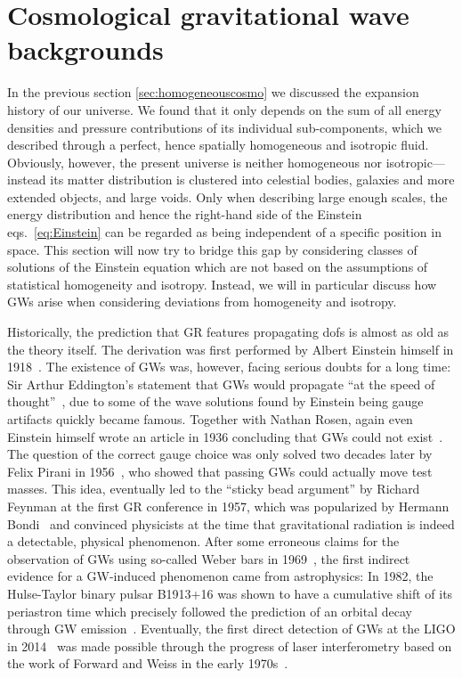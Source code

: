 \section{Cosmological gravitational wave backgrounds}  \label{sec:GWs}

In the previous section \ref{sec:homogeneouscosmo} we discussed the expansion history of our universe. We found that it only depends on the sum of all energy densities and pressure contributions of its individual sub-components, which we described through a perfect, hence spatially homogeneous and isotropic fluid. Obviously, however, the present universe is neither homogeneous nor  isotropic---instead its matter distribution is clustered into celestial bodies, galaxies and more extended objects, and large voids. Only when describing large enough scales, the energy distribution and hence the right-hand side of the Einstein eqs.~\eqref{eq:Einstein} can be regarded as being independent of a specific position in space. This section will now try to bridge this gap by considering classes of solutions of the Einstein equation which are not based on the assumptions of statistical homogeneity and isotropy. Instead, we will in particular discuss how \acfp{GW} arise when considering deviations from homogeneity and isotropy.

Historically, the prediction that \ac{GR} features propagating \acp{dof} is almost as old as the theory itself. The derivation was first performed by Albert Einstein himself in 1918~\cite{Einstein:1916cc, Einstein:1918btx}. The existence of \acp{GW} was, however, facing serious doubts for a long time: Sir Arthur Eddington's statement that \acp{GW} would propagate ``at the speed of thought''~\cite{Eddington:1922ds},  due to some of the wave solutions found by Einstein being gauge artifacts quickly became famous. Together with Nathan Rosen, again even Einstein himself wrote an article in 1936 concluding that \acp{GW} could not exist~\cite{Einstein:1937qu}. The question of the correct gauge choice was only solved two decades later by Felix Pirani in 1956~\cite{Pirani:1956tn}, who showed that passing \acp{GW} could actually move test masses. This idea, eventually led to the ``sticky bead argument'' by Richard Feynman at the first \ac{GR} conference in 1957, which was popularized by Hermann Bondi~\cite{Bondi:1957dt} and convinced physicists at the time that  gravitational radiation is indeed a detectable, physical phenomenon. After some erroneous claims for the observation of \acp{GW} using so-called Weber bars in 1969~\cite{Weber:1969bz}, the first indirect evidence for a \ac{GW}-induced phenomenon came from astrophysics: In 1982, the Hulse-Taylor binary pulsar B1913+16 was shown to have a cumulative shift of its periastron time which precisely followed the prediction of an orbital decay through \ac{GW} emission~\cite{Hulse:1974eb}. Eventually, the first direct detection of \acp{GW} at the \acf{LIGO} in 2014~\cite{LIGOScientific:2016aoc} was made possible through the progress of laser interferometry based on the work of Forward and Weiss in the early 1970s~\cite{Moss:1971ocz, Weiss:2022ols}.

